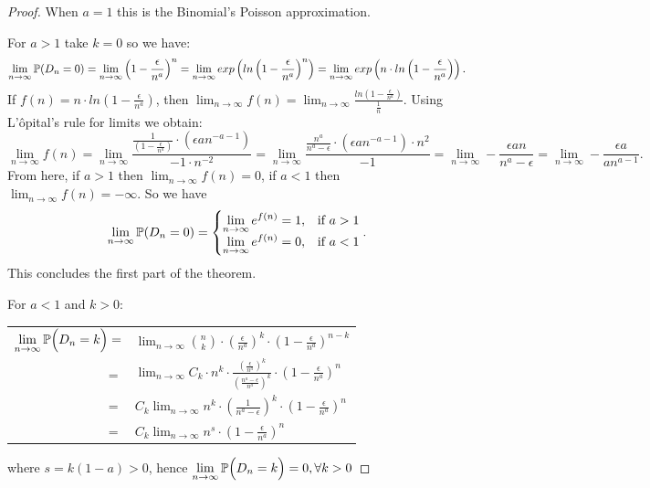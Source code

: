 \begin{proof}
When $a=1$ this is the Binomial's Poisson approximation.

For $a>1$ take $k=0$ so we have:
$$\displaystyle\lim_{n\to \infty} \P(D_n = 0) = \displaystyle\lim_{n\to \infty } \left( 1 - \frac{\epsilon}{n^a}\right)^n = \displaystyle\lim_{n\to \infty} exp\left( ln \left( 1 - \frac{\epsilon}{n^a}\right)^n\right) = \displaystyle\lim_{n\to \infty} exp\left(n \cdot ln \left( 1 - \frac{\epsilon}{n^a}\right)\right).$$
If $f(n)=  n \cdot ln \left( 1 - \frac{\epsilon}{n^a}\right)$, then $\displaystyle\lim_{n\to \infty} f(n) = \displaystyle\lim_{n\to \infty}\frac{ln \left( 1 - \frac{\epsilon}{n^a}\right)}{\frac{1}{n}}$. Using L'ôpital's rule for limits we obtain:
$$\displaystyle\lim_{n\to \infty } f(n) = 
\displaystyle\lim_{n\to \infty } \frac{\frac{1}{\left( 1 - \frac{\epsilon}{n^a}\right)}\cdot (\epsilon a n^{-a-1})}
{-1\cdot n^{-2}} = 
\displaystyle\lim_{n\to \infty } \frac{\frac{n^a}{n^{a} - \epsilon}\cdot (\epsilon a n^{-a-1}) \cdot {n^{2}}}{-1} = 
\displaystyle\lim_{n\to \infty } - \frac{\epsilon a n}{n^{a} - \epsilon} =
\displaystyle\lim_{n\to \infty } - \frac{\epsilon a}{a n^{a-1}}
.$$
From here, if $a>1$ then $\displaystyle\lim_{n\to \infty } f(n) = 0$, if $a<1$ then $\displaystyle\lim_{n\to \infty } f(n) = -\infty$. So we have
$$ \displaystyle\lim_{n\to \infty} \P(D_n=0) = \begin{cases} 
\displaystyle\lim_{n\to \infty}e^{f(n)} = 1, & \mbox{if } a>1 \\ 
\displaystyle\lim_{n\to \infty}e^{f(n)} = 0, & \mbox{if } a<1 \end{cases}.$$
This concludes the first part of the theorem. 

For $a<1$ and $k>0$:
\begin{center}
\begin{tabular}{ r l }
 $\displaystyle\lim_{n\to \infty } \P\Big(D_n=k\Big) =$ & $\displaystyle\lim_{n\to \infty} \binom{n}{k} \cdot \left( \frac{\epsilon}{n^a} \right)^k \cdot \left( 1-\frac{\epsilon}{n^a}\right)^{n-k}$ \\
$=$ &  $\displaystyle\lim_{n\to \infty} C_{k}\cdot n^k\cdot  \frac{\left(\frac{\epsilon}{n^a}\right)^k} {\left(\frac{n^a - \epsilon}{n^a}\right)^k} \cdot \left(1-\frac{\epsilon}{n^a}\right)^{n} $\\
$=$ &  $C_{k}\displaystyle\lim_{n\to \infty} n^k \cdot \left(\frac{1} {n^a - \epsilon}\right)^k \cdot \left(1-\frac{\epsilon}{n^a}\right)^{n} $\\
$=$ &  $C_{k} \displaystyle\lim_{n\to \infty}  n^s\cdot \left(1-\frac{\epsilon}{n^a}\right)^{n}$\\
\end{tabular}
\end{center}

where $s=k(1-a)>0$, hence $\displaystyle\lim_{n\to \infty } \P\Big(D_n=k\Big) = 0, \forall k>0 \qedhere$ 

\end{proof}

